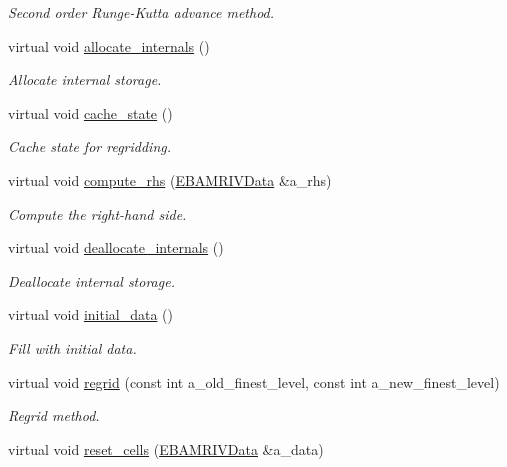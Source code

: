 \begin{DoxyCompactItemize}
\begin{DoxyCompactList}\small\item\em Second order Runge-\/\+Kutta advance method. \end{DoxyCompactList}\item 
virtual void \hyperlink{classsigma__solver_a9979ad817f215312977a91ac6d0a8da0}{allocate\+\_\+internals} ()
\begin{DoxyCompactList}\small\item\em Allocate internal storage. \end{DoxyCompactList}\item 
virtual void \hyperlink{classsigma__solver_a1b18e14fb78e6ad960739e2c18b4eba8}{cache\+\_\+state} ()
\begin{DoxyCompactList}\small\item\em Cache state for regridding. \end{DoxyCompactList}\item 
virtual void \hyperlink{classsigma__solver_aee9c0e0d4e3db097343a9abe9336b66b}{compute\+\_\+rhs} (\hyperlink{type__definitions_8H_a6b8fa905d55cbb491b52180386f0e0c1}{E\+B\+A\+M\+R\+I\+V\+Data} \&a\+\_\+rhs)
\begin{DoxyCompactList}\small\item\em Compute the right-\/hand side. \end{DoxyCompactList}\item 
virtual void \hyperlink{classsigma__solver_a930027d952e57987394ed4f088a4f455}{deallocate\+\_\+internals} ()
\begin{DoxyCompactList}\small\item\em Deallocate internal storage. \end{DoxyCompactList}\item 
virtual void \hyperlink{classsigma__solver_ae04b753577d5a797dc8aeb8051ae65ac}{initial\+\_\+data} ()
\begin{DoxyCompactList}\small\item\em Fill with initial data. \end{DoxyCompactList}\item 
virtual void \hyperlink{classsigma__solver_a22050219f7e5817a2a9d250788a4a40b}{regrid} (const int a\+\_\+old\+\_\+finest\+\_\+level, const int a\+\_\+new\+\_\+finest\+\_\+level)
\begin{DoxyCompactList}\small\item\em Regrid method. \end{DoxyCompactList}\item 
virtual void \hyperlink{classsigma__solver_a9112989d1788f9300fb3662b1093b13a}{reset\+\_\+cells} (\hyperlink{type__definitions_8H_a6b8fa905d55cbb491b52180386f0e0c1}{E\+B\+A\+M\+R\+I\+V\+Data} \&a\+\_\+data)

\end{DoxyCompactItemize}
